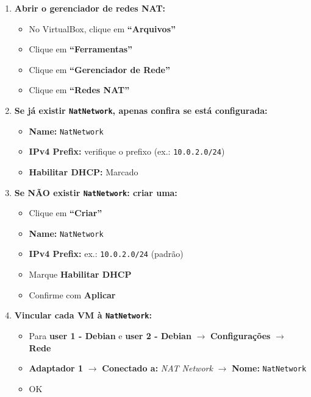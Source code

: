 \begin{enumerate}
\item \textbf{Abrir o gerenciador de redes NAT:}
  \begin{itemize}
    \item No VirtualBox, clique em \textbf{``Arquivos''}
    \item Clique em \textbf{``Ferramentas''}
    \item Clique em \textbf{``Gerenciador de Rede''}
    \item Clique em \textbf{``Redes NAT''}
  \end{itemize}

\item \textbf{Se já existir \texttt{NatNetwork}, apenas confira se está configurada:}
  \begin{itemize}
    \item \textbf{Name:} \texttt{NatNetwork}
    \item \textbf{IPv4 Prefix:} verifique o prefixo (ex.: \texttt{10.0.2.0/24})
    \item \textbf{Habilitar DHCP:} Marcado
  \end{itemize}

\item \textbf{Se NÃO existir \texttt{NatNetwork}: criar uma:}
  \begin{itemize}
    \item Clique em \textbf{``Criar''}
    \item \textbf{Name:} \texttt{NatNetwork}
    \item \textbf{IPv4 Prefix:} ex.: \texttt{10.0.2.0/24} (padrão)
    \item Marque \textbf{Habilitar DHCP}
    \item Confirme com \textbf{Aplicar}
  \end{itemize}


\item \textbf{Vincular cada VM à \texttt{NatNetwork}:}
  \begin{itemize}
    \item Para \textbf{user 1 - Debian} e \textbf{user 2 - Debian} $\rightarrow$ \textbf{Configurações} $\rightarrow$ \textbf{Rede}
    \item \textbf{Adaptador 1} $\rightarrow$ \textbf{Conectado a:} \textit{NAT Network} $\rightarrow$ \textbf{Nome:} \texttt{NatNetwork}
    \item OK
  \end{itemize}


\end{enumerate}
